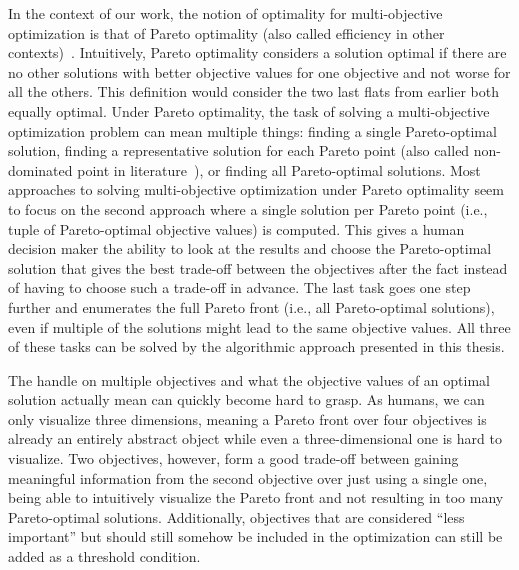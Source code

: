 In the context of our work, the notion of optimality for multi-objective optimization is that of Pareto optimality (also called efficiency in other contexts)~\autocite{Ehrgott2005-2}.
Intuitively, Pareto optimality considers a solution optimal if there are no other solutions with better objective values for one objective and not worse for all the others. 
This definition would consider the two last flats from earlier both equally optimal.
Under Pareto optimality, the task of solving a multi-objective optimization problem can mean multiple things:
finding a single Pareto-optimal solution, finding a representative solution for each Pareto point (also called non-dominated point in literature~\autocite{Ehrgott2005-2}), or finding all Pareto-optimal solutions.
Most approaches to solving multi-objective optimization under Pareto optimality seem to focus on the second approach where a single solution per Pareto point (i.e., tuple of Pareto-optimal objective values) is computed.
This gives a human decision maker the ability to look at the results and choose the Pareto-optimal solution that gives the best trade-off between the objectives after the fact instead of having to choose such a trade-off in advance.
The last task goes one step further and enumerates the full Pareto front (i.e., all Pareto-optimal solutions), even if multiple of the solutions might lead to the same objective values.
All three of these tasks can be solved by the algorithmic approach presented in this thesis.

The handle on multiple objectives and what the objective values of an optimal solution actually mean can quickly become hard to grasp.
As humans, we can only visualize three dimensions, meaning a Pareto front over four objectives is already an entirely abstract object while even a three-dimensional one is hard to visualize.
Two objectives, however, form a good trade-off between gaining meaningful information from the second objective over just using a single one, being able to intuitively visualize the Pareto front and not resulting in too many Pareto-optimal solutions.
Additionally, objectives that are considered ``less important'' but should still somehow be included in the optimization can still be added as a threshold condition.

